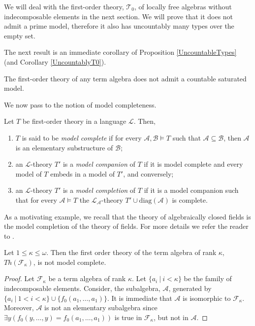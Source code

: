\documentclass[a4paper,11pt]{article}
\begin{document}
\begin{remark}
We will deal with the first-order theory, $\mathcal{T}_0$, of locally free algebras without indecomposable elements in the next section. We will prove that it does not admit a prime model, therefore it also has uncountably many types over the empty set. 
\end{remark}

The next result is an immediate corollary of Proposition \ref{UncountableTypes} (and Corollary \ref{UncountablyT0}).

\begin{corollary}
The first-order theory of any term algebra does not admit a countable saturated model. 
\end{corollary}

We now pass to the notion of model completeness.

\begin{definition}
    Let $T$ be first-order theory in a language $\mathcal{L}$. Then,
    \begin{enumerate}
        \item $T$ is said to be \emph{model complete} if for every $\mathcal{A},\mathcal{B}\models T$ such that $\mathcal{A}\subseteq \mathcal{B}$, then $\mathcal{A}$ is an elementary substructure of $\mathcal{B}$; 
        \item an $\mathcal{L}$-theory $T'$ is a \emph{model companion} of $T$ if it is model complete and every model of $T$ embeds in a model of $T'$, and conversely;
        \item an $\mathcal{L}$-theory $T'$ is a \emph{model completion} of $T$ if it is a model companion such that for every $\mathcal{A}\models T$ the $\mathcal{L}_{\mathcal{A}}$-theory $T'\cup\mathrm{diag}(\mathcal{A})$ is complete.
    \end{enumerate}
\end{definition}

As a motivating example, we recall that the theory of algebraically closed fields is the model completion of the theory of fields. For more details we refer the reader to \cite[Section 3.5]{ChangKeisler1990ModelTheory}.

\begin{proposition}
Let $1\leq \kappa\leq \omega$. Then the first order theory of the term algebra of rank $\kappa$, $Th(\mathcal{F}_\kappa)$, is not model complete.
\end{proposition}
\begin{proof}
Let $\mathcal{F}_\kappa$ be a term algebra of rank $\kappa$. Let $\{a_i \ | \ i<\kappa\}$ be the family of indecomposable elements. Consider, the subalgebra, $\mathcal{A}$, generated by $\{a_i \ | \ 1< i < \kappa\} \cup \{f_0(a_1,\ldots, a_1)\}$. It is immediate that $\mathcal{A}$ is isomorphic to $\mathcal{F}_\kappa$. Moreover, $\mathcal{A}$ is not an elementary subalgebra since $\exists y (f_0(y,\ldots, y)=f_0(a_1,\ldots,a_1))$ is true in $\mathcal{F}_\kappa$, but not in $\mathcal{A}$. 
\end{proof}
\end{document}
